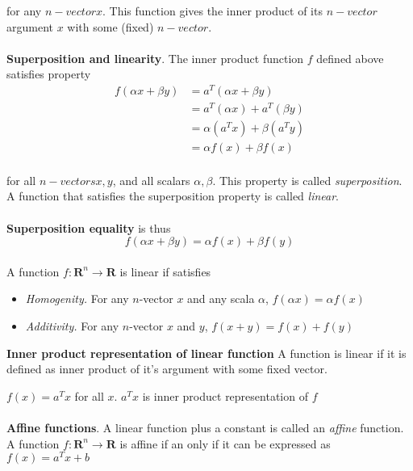 \documentclass[a4paper, 12pt]{article}
\begin{document}
for any $n-vector x$. This function gives the inner product of its $n-vector$ argument $x$ with
some (fixed) $n-vector$.
\\
\\ 
\textbf{Superposition and linearity}. The inner product function $f$ defined above satisfies
property
\begin{align*}
f(\alpha x +\beta y) &= a^T(\alpha x + \beta y) \\
&= a^T(\alpha x) + a^T(\beta y) \\
&= \alpha(a^Tx) + \beta(a^Ty) \\
&= \alpha f(x) + \beta f(x)
\end{align*}
\\
for all $n-vectors x, y$, and all scalars $\alpha, \beta$. This property is called \textit{superposition}.
 A function that satisfies the superposition property is called \textit{linear}.
\\
\\
\textbf{Superposition equality} is thus
\begin{equation}
f(\alpha x + \beta y) = \alpha f(x) + \beta f(y)
\end{equation}
\\
A function  $ f: \mathbf{R}^n \to \mathbf{R} $ is linear if satisfies
\begin{itemize}
\item \textit{Homogenity.} For any $n$-vector $x$ and any scala $\alpha$, $f(\alpha x) = \alpha f(x)$
\item \textit{Additivity.} For any $n$-vector $x$ and $y$, $f(x + y) = f(x) + f(y)$
\end{itemize}

\textbf{Inner product representation of linear function}
A function is linear if it is defined as inner product of it's argument with some fixed vector.

$f(x) = a^Tx$ for all $x$.
$a^Tx$ is inner product representation of $f$
\\
\\
\textbf{Affine functions}. A linear function plus a constant is called an \textit{affine} function.
A function $f: \mathbf{R} ^n \to \mathbf{R}$ is affine if an only if it can be expressed as $f(x) = a^T x + b$
\end{document}
